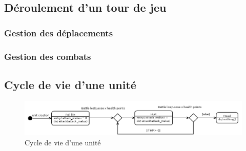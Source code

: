 \subsection{Déroulement d'un tour de jeu}
\subsubsection{Gestion des déplacements}
\subsubsection{Gestion des combats}

\subsection{Cycle de vie d'une unité}

\begin{figure}[!h]
  \centering
  \includegraphics[width=13cm]{schemas/state-diagram.png}
  \caption{Cycle de vie d'une unité}
  \label{state-diagram}
\end{figure}


